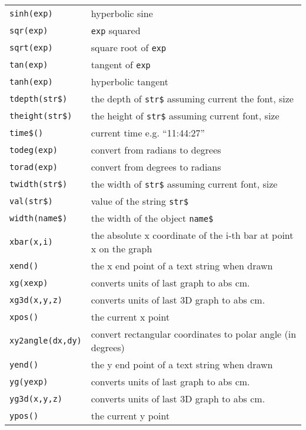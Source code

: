 \begin{supertabular}{ll}
{\tt sinh(exp)}        	& hyperbolic sine \\
{\tt sqr(exp)}          	& {\tt exp} squared  \\
{\tt sqrt(exp)}        	& square root of {\tt exp} \\
{\tt tan(exp)}          	& tangent of {\tt exp} \\	 
{\tt tanh(exp)}        	& hyperbolic tangent \\
{\tt tdepth(str\$)}  	& the depth of {\tt str\$} assuming current the font, size \\
{\tt theight(str\$)}   & the height of {\tt str\$} assuming  current font, size \\
{\tt time\$()}       	& current time e.g. ``11:44:27'' \\
{\tt todeg(exp)}      	& convert from radians to degrees \\
{\tt torad(exp)}      	& convert from degrees to radians \\
{\tt twidth(str\$)}  	& the width of {\tt str\$} assuming current font, size \\
{\tt val(str\$)}        	& value of the string {\tt str\$} \\
{\tt width(name\$)}  	& the width of the object {\tt name\$} \\
{\tt xbar(x,i)}         	& the absolute x coordinate of the i-th bar at point x on the graph \\
{\tt xend()}           	& the x end point of a text string when drawn \\
{\tt xg(xexp)}              & converts units of last graph to abs cm. \\
{\tt xg3d(x,y,z)}         & converts units of last 3D graph to abs cm. \\
{\tt xpos()}           	& the current x point \\
{\tt xy2angle(dx,dy)} & convert rectangular coordinates to polar angle (in degrees)\\
{\tt yend()}           	& the y end point of a text string when drawn \\
{\tt yg(yexp)}              & converts units of last graph to abs cm. \\
{\tt yg3d(x,y,z)}         & converts units of last 3D graph to abs cm. \\
{\tt ypos()}           	& the current y point \\
\end{supertabular}


